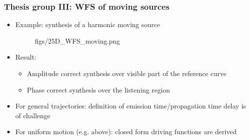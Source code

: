 \documentclass{beamer}
\begin{document}
\begin{frame}
\frametitle{Thesis group III: WFS of moving sources}
\begin{itemize}
\item Example: synthesis of a harmonic moving source
\begin{figure}  
\hspace{-10mm}
	\begin{overpic}[width = 0.95\columnwidth ]{figs/25D_WFS_moving.png}
	\end{overpic}  
\end{figure}
\item Result:
\begin{itemize}
\small
	\item Amplitude correct synthesis over visible part of the reference curve
	\item Phase correct synthesis over the listening region
\end{itemize}
\item For general trajectories: definition of emission time/propagation time delay is of challenge
\item For uniform motion (e.g. above): closed form driving functions are derived
\end{itemize}
\end{frame}
\end{document}
